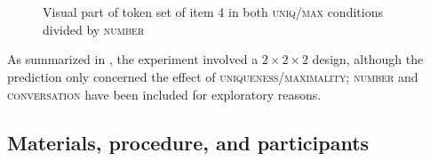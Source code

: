 \documentclass[output=paper]{langscibook}
\begin{document}
\begin{figure*}
\centering
\hspace{.3cm}
~

\hspace{.3cm}
~
\caption{Visual part of token set of item 4 in both \textsc{uniq/max} conditions divided by \textsc{number}}\label{sim-dem:fig:window}
\end{figure*}

As summarized in , the experiment involved a $2\times 2\times 2$ design, although the prediction only concerned the effect of \textsc{uniqueness/maximality}; \textsc{number} and \textsc{conversation} have been included for exploratory reasons.

\subsection{Materials, procedure, and participants}\label{sim-dem:sec:materials}
\end{document}
